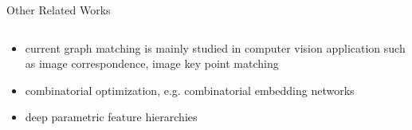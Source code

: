 \documentclass{beamer}
\begin{document}
\begin{frame}{Other Related Works}

\begin{columns}
\begin{column}{0.5\linewidth}

\begin{itemize}
    \item current graph matching is mainly studied in computer vision application such as image correspondence, image key point matching
    \item combinatorial optimization, e.g. combinatorial embedding networks \cite{DBLP:conf/iccv/WangYY19}
    \item deep parametric feature hierarchies \cite{DBLP:conf/cvpr/ZanfirS18}
\end{itemize}
\end{column}


\end{columns}
\end{frame}
\end{document}
